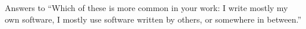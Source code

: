Answers to ``Which of these is more common in your work: I write mostly my own software, I mostly use software written by others, or somewhere in between.''